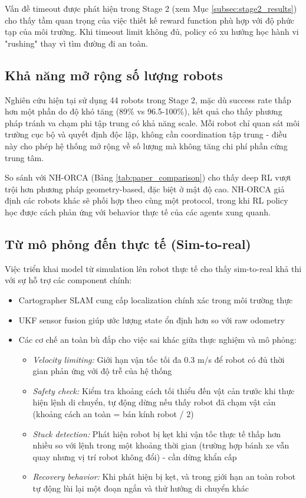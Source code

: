 Vấn đề timeout được phát hiện trong Stage 2 (xem Mục \ref{subsec:stage2_results}) cho thấy tầm quan trọng của việc thiết kế reward function phù hợp với độ phức tạp của môi trường. Khi timeout limit không đủ, policy có xu hướng học hành vi "rushing" thay vì tìm đường đi an toàn.

\subsection{Khả năng mở rộng số lượng robots}

Nghiên cứu hiện tại sử dụng 44 robots trong Stage 2, mặc dù success rate thấp hơn một phần do độ khó tăng (89\% vs 96.5-100\%), kết quả cho thấy phương pháp tránh va chạm phi tập trung có khả năng scale. Mỗi robot chỉ quan sát môi trường cục bộ và quyết định độc lập, không cần coordination tập trung - điều này cho phép hệ thống mở rộng về số lượng mà không tăng chi phí phần cứng trung tâm.

So sánh với NH-ORCA (Bảng \ref{tab:paper_comparison}) cho thấy deep RL vượt trội hơn phương pháp geometry-based, đặc biệt ở mật độ cao. NH-ORCA giả định các robots khác sẽ phối hợp theo cùng một protocol, trong khi RL policy học được cách phản ứng với behavior thực tế của các agents xung quanh.

\subsection{Từ mô phỏng đến thực tế (Sim-to-real) }

Việc triển khai model từ simulation lên robot thực tế cho thấy sim-to-real khả thi với sự hỗ trợ các component chính:
\begin{itemize}[nosep]
\item Cartographer SLAM cung cấp localization chính xác trong môi trường thực
\item UKF sensor fusion giúp ước lượng state ổn định hơn so với raw odometry
\item Các cơ chế an toàn bù đắp cho việc sai khác giữa thực nghiệm và mô phỏng:
\begin{itemize}[nosep]
\item \textit{Velocity limiting:} Giới hạn vận tốc tối đa 0.3 m/s để robot có đủ thời gian phản ứng với độ trễ của hệ thống
\item \textit{Safety check:} Kiểm tra khoảng cách tối thiểu đến vật cản trước khi thực hiện lệnh di chuyển, tự động dừng nếu thấy robot đã chạm vật cản (khoảng cách an toàn = bán kính robot / 2)
\item \textit{Stuck detection:} Phát hiện robot bị kẹt khi vận tốc thực tế thấp hơn nhiều so với lệnh trong một khoảng thời gian (trường hợp bánh xe vẫn quay nhưng vị trí robot không đổi) - cần dừng khẩn cấp
\item \textit{Recovery behavior:} Khi phát hiện bị kẹt, và trong giới hạn an toàn robot tự động lùi lại một đoạn ngắn và thử hướng di chuyển khác
\end{itemize}
\end{itemize}

